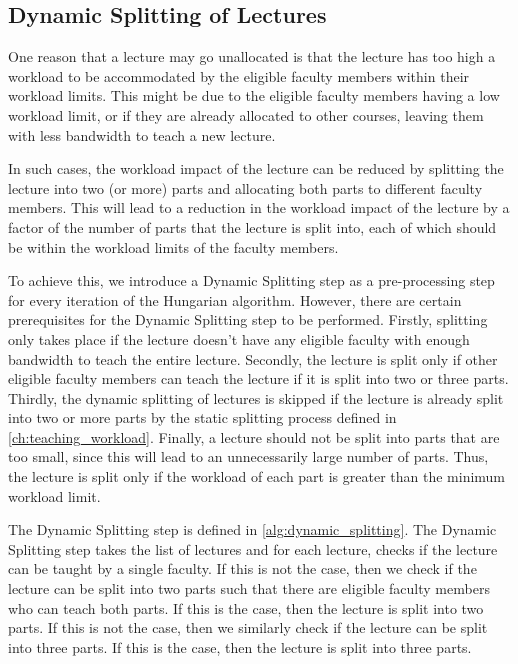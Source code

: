 \subsection{Dynamic Splitting of Lectures}
\label{sec:dynamic_splitting}

One reason that a lecture may go unallocated is that the lecture has too high a workload to be accommodated by the eligible faculty members within their workload limits. This might be due to the eligible faculty members having a low workload limit, or if they are already allocated to other courses, leaving them with less bandwidth to teach a new lecture.

In such cases, the workload impact of the lecture can be reduced by splitting the lecture into two (or more) parts and allocating both parts to different faculty members. This will lead to a reduction in the workload impact of the lecture by a factor of the number of parts that the lecture is split into, each of which should be within the workload limits of the faculty members.

To achieve this, we introduce a Dynamic Splitting step as a pre-processing step for every iteration of the Hungarian algorithm. However, there are certain prerequisites for the Dynamic Splitting step to be performed. Firstly, splitting only takes place if the lecture doesn't have any eligible faculty with enough bandwidth to teach the entire lecture. Secondly, the lecture is split only if other eligible faculty members can teach the lecture if it is split into two or three parts. Thirdly, the dynamic splitting of lectures is skipped if the lecture is already split into two or more parts by the static splitting process defined in \autoref{ch:teaching_workload}. Finally, a lecture should not be split into parts that are too small, since this will lead to an unnecessarily large number of parts. Thus, the lecture is split only if the workload of each part is greater than the minimum workload limit.

The Dynamic Splitting step is defined in \autoref{alg:dynamic_splitting}. The Dynamic Splitting step takes the list of lectures and for each lecture, checks if the lecture can be taught by a single faculty. If this is not the case, then we check if the lecture can be split into two parts such that there are eligible faculty members who can teach both parts. If this is the case, then the lecture is split into two parts. If this is not the case, then we similarly check if the lecture can be split into three parts. If this is the case, then the lecture is split into three parts.

